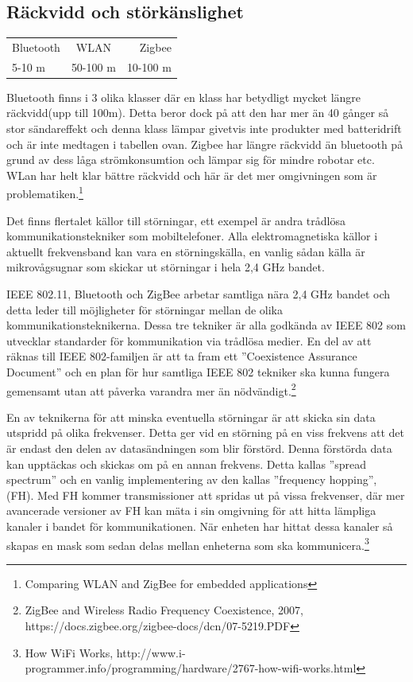 \documentclass[a4paper,12pt,fleqn]{article}
\begin{document}
\newpage
\subsection{Räckvidd och störkänslighet}
\begin{tabular}{lcr}
	\hline
	Bluetooth & WLAN & Zigbee \\
	5-10 m  & 50-100 m   & 10-100 m\\
	\hline
 \end{tabular}
\newline

Bluetooth finns i 3 olika klasser där en klass har betydligt mycket längre räckvidd(upp till 100m). Detta beror dock på att den har mer än 40 gånger så stor sändareffekt och denna klass lämpar givetvis inte produkter med batteridrift och är inte medtagen i tabellen ovan. Zigbee har längre räckvidd än bluetooth på grund av dess låga strömkonsumtion och lämpar sig för mindre robotar etc. 
WLan har helt klar bättre räckvidd och  här är det mer omgivningen som är problematiken.\footnote{
Comparing WLAN and ZigBee for embedded applications}


Det finns flertalet källor till störningar, ett exempel är andra trådlösa kommunikationstekniker som mobiltelefoner. Alla elektromagnetiska källor i aktuellt frekvensband kan vara en störningskälla, en vanlig sådan källa är mikrovågsugnar som skickar ut störningar i hela 2,4 GHz bandet.

IEEE 802.11, Bluetooth och ZigBee arbetar samtliga nära 2,4 GHz bandet och detta leder till möjligheter för störningar mellan de olika kommunikationsteknikerna. Dessa tre tekniker är alla godkända av IEEE 802 som utvecklar standarder för kommunikation via trådlösa medier. En del av att räknas till IEEE 802-familjen är att ta fram ett ''Coexistence Assurance Document'' och en plan för hur samtliga IEEE 802 tekniker ska kunna fungera gemensamt utan att påverka varandra mer än nödvändigt.\footnote{ZigBee and Wireless Radio
Frequency Coexistence, 2007, https://docs.zigbee.org/zigbee-docs/dcn/07-5219.PDF}

En av teknikerna för att minska eventuella störningar är att skicka sin data utspridd på olika frekvenser. Detta ger vid en störning på en viss frekvens att det är endast den delen av datasändningen som blir förstörd. Denna förstörda data kan upptäckas och skickas om på en annan frekvens. Detta kallas ''spread spectrum'' och en vanlig implementering av den kallas ''frequency hopping'', (FH). Med FH kommer transmissioner att spridas ut på vissa frekvenser, där mer avancerade versioner av FH kan mäta i sin omgivning för att hitta lämpliga kanaler i bandet för kommunikationen. När enheten har hittat dessa kanaler så skapas en mask som sedan delas mellan enheterna som ska kommunicera.\footnote{
How WiFi Works, http://www.i-programmer.info/programming/hardware/2767-how-wifi-works.html}
\end{document}
